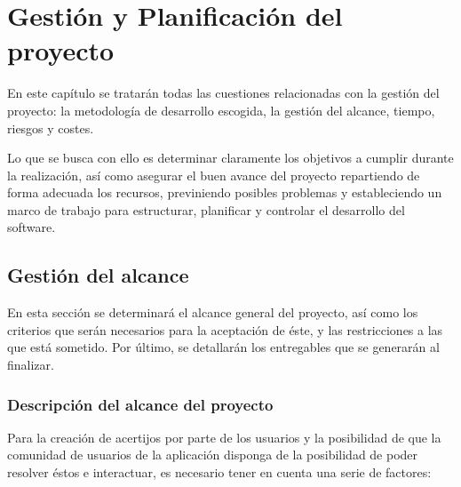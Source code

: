 \chapter{Gestión y Planificación del proyecto}
En este capítulo se tratarán todas las cuestiones relacionadas con la gestión del proyecto: la metodología de desarrollo escogida, la gestión del alcance, tiempo, riesgos y costes.

Lo que se busca con ello es determinar claramente los objetivos a cumplir durante la realización, así como asegurar el buen avance del proyecto repartiendo de forma adecuada los recursos, previniendo posibles problemas y estableciendo un marco de trabajo para estructurar, planificar y controlar el desarrollo del software.

\section{Gestión del alcance}
En esta sección se determinará el alcance general del proyecto, así como los criterios que serán necesarios para la aceptación de éste, y las restricciones a las que está sometido. Por último, se detallarán los entregables que se generarán al finalizar.

\subsection{Descripción del alcance del proyecto}
Para la creación de acertijos por parte de los usuarios y la posibilidad de que la comunidad de usuarios de la aplicación disponga de la posibilidad de poder resolver éstos e interactuar, es necesario tener en cuenta una serie de factores:

